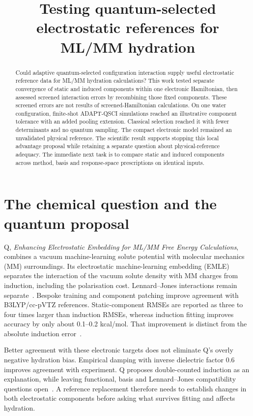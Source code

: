 \documentclass{article}
\title{Testing quantum-selected electrostatic references for ML/MM hydration}
\begin{document}
\maketitle

\begin{abstract}
Could adaptive quantum-selected configuration interaction supply useful electrostatic reference data for ML/MM hydration calculations? This work tested separate convergence of static and induced components within one electronic Hamiltonian, then assessed screened interaction errors by recombining those fixed components. These screened errors are not results of screened-Hamiltonian calculations. On one water configuration, finite-shot ADAPT-QSCI simulations reached an illustrative component tolerance with an added pooling extension. Classical selection reached it with fewer determinants and no quantum sampling. The compact electronic model remained an unvalidated physical reference. The scientific result supports stopping this local advantage proposal while retaining a separate question about physical-reference adequacy. The immediate next task is to compare static and induced components across method, basis and response-space prescriptions on identical inputs.
\end{abstract}

\section{The chemical question and the quantum proposal}
Q, \emph{Enhancing Electrostatic Embedding for ML/MM Free Energy Calculations}, combines a vacuum machine-learning solute potential with molecular mechanics (MM) surroundings. Its electrostatic machine-learning embedding (EMLE) separates the interaction of the vacuum solute density with MM charges from induction, including the polarisation cost. Lennard--Jones interactions remain separate~\cite{Q}. Bespoke training and component patching improve agreement with B3LYP/cc-pVTZ references. Static-component RMSEs are reported as three to four times larger than induction RMSEs, whereas induction fitting improves accuracy by only about 0.1--0.2 kcal/mol. That improvement is distinct from the absolute induction error~\cite{Q}.

Better agreement with these electronic targets does not eliminate Q's overly negative hydration bias. Empirical damping with inverse dielectric factor 0.6 improves agreement with experiment. Q proposes double-counted induction as an explanation, while leaving functional, basis and Lennard--Jones compatibility questions open~\cite{Q}. A reference replacement therefore needs to establish changes in both electrostatic components before asking what survives fitting and affects hydration.
\end{document}
